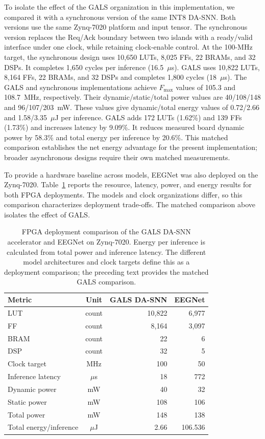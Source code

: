 ﻿\documentclass[12pt]{article}
\begin{document}
To isolate the effect of the GALS organization in this implementation, we compared it with a synchronous version of the same INT8 DA-SNN. Both versions use the same Zynq-7020 platform and input tensor. The synchronous version replaces the Req/Ack boundary between two islands with a ready/valid interface under one clock, while retaining clock-enable control. At the 100-MHz target, the synchronous design uses 10,650 LUTs, 8,025 FFs, 22 BRAMs, and 32 DSPs. It completes 1,650 cycles per inference (16.5~$\mu$s). GALS uses 10,822 LUTs, 8,164 FFs, 22 BRAMs, and 32 DSPs and completes 1,800 cycles (18~$\mu$s). The GALS and synchronous implementations achieve $F_{\max}$ values of 105.3 and 108.7~MHz, respectively. Their dynamic/static/total power values are 40/108/148 and 96/107/203~mW. These values give dynamic/total energy values of 0.72/2.66 and 1.58/3.35~$\mu$J per inference. GALS adds 172 LUTs (1.62\%) and 139 FFs (1.73\%) and increases latency by 9.09\%. It reduces measured board dynamic power by 58.3\% and total energy per inference by 20.6\%. This matched comparison establishes the net energy advantage for the present implementation; broader asynchronous designs require their own matched measurements.

To provide a hardware baseline across models, EEGNet was also deployed on the Zynq-7020. Table~\ref{tab:fpga_eegnet_comparison} reports the resource, latency, power, and energy results for both FPGA deployments. The models and clock organizations differ, so this comparison characterizes deployment trade-offs. The matched comparison above isolates the effect of GALS.

\begin{table}[!htbp]
\centering
\caption{FPGA deployment comparison of the GALS DA-SNN accelerator and EEGNet on Zynq-7020. Energy per inference is calculated from total power and inference latency. The different model architectures and clock targets define this as a deployment comparison; the preceding text provides the matched GALS comparison.}
\label{tab:fpga_eegnet_comparison}
\scriptsize
\renewcommand{\arraystretch}{1.14}
\setlength{\tabcolsep}{4pt}
\begin{tabular}{@{}lcrr@{}}
\toprule
Metric & Unit & GALS DA-SNN & EEGNet \\
\midrule
LUT & count & 10,822 & 6,977 \\
FF & count & 8,164 & 3,097 \\
BRAM & count & 22 & 6 \\
DSP & count & 32 & 5 \\
Clock target & MHz & 100 & 50 \\
Inference latency & $\mu$s & 18 & 772 \\
Dynamic power & mW & 40 & 32 \\
Static power & mW & 108 & 106 \\
Total power & mW & 148 & 138 \\
Total energy/inference & $\mu$J & 2.66 & 106.536 \\
\bottomrule
\end{tabular}
\end{table}
\end{document}

